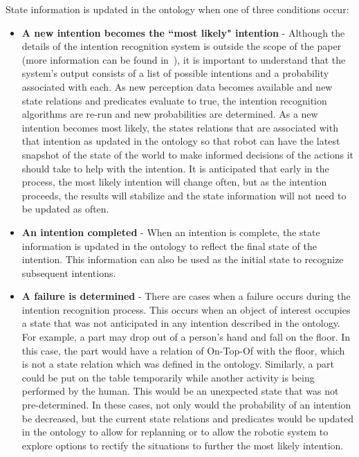 \documentclass[preprint,12pt]{elsarticle}
\begin{document}
State information is updated in the ontology when one of three conditions occur:

\begin{itemize}
\item \textbf{A new intention becomes the ``most likely" intention} - Although the details of the intention recognition system is outside the scope of the paper (more information can be found in~\cite{SCHLENOFF.ECDRM.2012}), it is important to understand that the system's output consists of a list of possible intentions and a probability associated with each. As new perception data becomes available and new state relations and predicates evaluate to true, the intention recognition algorithms are re-run and new probabilities are determined. As a new intention becomes most likely, the states relations that are associated with that intention as updated in the ontology so that robot can have the latest snapshot of the state of the world to make informed decisions of the actions it should take to help with the intention. It is anticipated that early in the process, the most likely intention will change often, but as the intention proceeds, the results will stabilize and the state information will not need to be updated as often.
\item \textbf{An intention completed} - When an intention is complete, the state information is updated in the ontology to reflect the final state of the intention. This information can also be used as the initial state to recognize subsequent intentions.
\item \textbf{A failure is determined} - There are cases when a failure occurs during the intention recognition process. This occurs when an object of interest occupies a state that was not anticipated in any intention described in the ontology. For example, a part may drop out of a person's hand and fall on the floor. In this case, the part would have a relation of On-Top-Of with the floor, which is not a state relation which was defined in the ontology. Similarly, a part could be put on the table temporarily while another activity is being performed by the human. This would be an unexpected state that was not pre-determined. In these cases, not only would the probability of an intention be decreased, but the current state relations and predicates would be updated in the ontology to allow for replanning or to allow the robotic system to explore options to rectify the situations to further the most likely intention.
\end{itemize}
\end{document}
